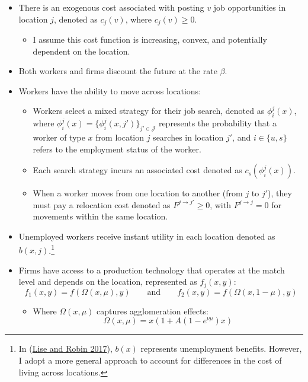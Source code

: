 \documentclass[
  letterpaper,
  DIV=11,
  numbers=noendperiod]{scrartcl}
\providecommand{\tightlist}{%
  \setlength{\itemsep}{0pt}\setlength{\parskip}{0pt}}\usepackage{longtable,booktabs,array}
\newcommand{\qaq}{\qquad \text{and} \qquad}
\begin{document}
\begin{itemize}
\tightlist
\item
  There is an exogenous cost associated with posting \(v\) job
  opportunities in location \(j\), denoted as \(c_{j}(v)\), where
  \(c_{j}(v) \geq 0\).

  \begin{itemize}
  \tightlist
  \item
    I assume this cost function is increasing, convex, and potentially
    dependent on the location.
  \end{itemize}
\item
  Both workers and firms discount the future at the rate \(\beta\).
\item
  Workers have the ability to move across locations:

  \begin{itemize}
  \tightlist
  \item
    Workers select a mixed strategy for their job search, denoted as
    \(\phi^j_i(x)\), where
    \(\phi^j_i(x) = \{\phi^j_i(x, j')\}_{j' \in \mathcal{J}}\)
    represents the probability that a worker of type \(x\) from location
    \(j\) searches in location \(j'\), and \(i \in \{u,s\}\) refers to
    the employment status of the worker.
  \item
    Each search strategy incurs an associated cost denoted as
    \(c_s(\phi_i^j(x))\).
  \item
    When a worker moves from one location to another (from \(j\) to
    \(j'\)), they must pay a relocation cost denoted as
    \(F^{j \to j'} \geq 0\), with \(F^{j \to j} = 0\) for movements
    within the same location.
  \end{itemize}
\item
  Unemployed workers receive instant utility in each location denoted as
  \(b(x,j)\).\footnote{In
    (\protect\hyperlink{ref-liseMacrodynamicsSortingWorkers2017}{Lise
    and Robin 2017}), \(b(x)\) represents unemployment benefits.
    However, I adopt a more general approach to account for differences
    in the cost of living across locations.}
\item
  Firms have access to a production technology that operates at the
  match level and depends on the location, represented as \(f_j(x, y)\):
  \[f_1(x,y) = f(\Omega(x,\mu), y) \qaq  f_2(x,y) = f(\Omega(x, 1-\mu), y)\]

  \begin{itemize}
  \tightlist
  \item
    Where \(\Omega(x, \mu)\) captures agglomeration effects:
    \[\Omega(x, \mu) = x(1+ A(1-e^{\nu \mu})x)\]
  \end{itemize}
\end{itemize}
\end{document}

